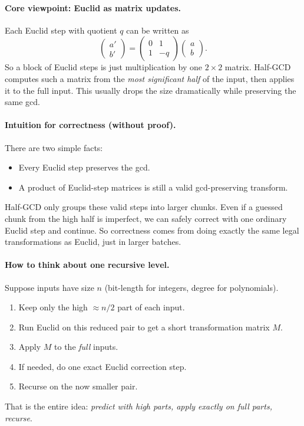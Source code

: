 \paragraph{Core viewpoint: Euclid as matrix updates.}
Each Euclid step with quotient $q$ can be written as
\[
\begin{pmatrix}a'\\ b'\end{pmatrix}
=
\begin{pmatrix}0 & 1\\ 1 & -q\end{pmatrix}
\begin{pmatrix}a\\ b\end{pmatrix}.
\]
So a block of Euclid steps is just multiplication by one $2\times 2$ matrix.
Half-GCD computes such a matrix from the \emph{most significant half}
of the input, then applies it to the full input.
This usually drops the size dramatically while preserving the same gcd.

\paragraph{Intuition for correctness (without proof).}
There are two simple facts:
\begin{itemize}
  \item Every Euclid step preserves the gcd.
  \item A product of Euclid-step matrices is still a valid gcd-preserving transform.
\end{itemize}
Half-GCD only groups these valid steps into larger chunks.
Even if a guessed chunk from the high half is imperfect,
we can safely correct with one ordinary Euclid step and continue.
So correctness comes from doing exactly the same legal transformations as Euclid,
just in larger batches.

\paragraph{How to think about one recursive level.}
Suppose inputs have size $n$ (bit-length for integers, degree for polynomials).
\begin{enumerate}
  \item Keep only the high $\approx n/2$ part of each input.
  \item Run Euclid on this reduced pair to get a short transformation matrix $M$.
  \item Apply $M$ to the \emph{full} inputs.
  \item If needed, do one exact Euclid correction step.
  \item Recurse on the now smaller pair.
\end{enumerate}
That is the entire idea: \emph{predict with high parts, apply exactly on full parts, recurse}.


